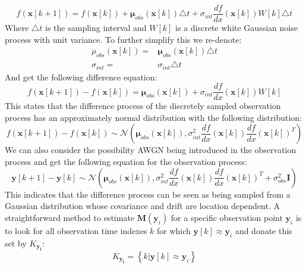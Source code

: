 \[
f\left(\mathbf{x}\left[k+1\right]\right)=f\left(\mathbf{x}\left[k\right]\right)+\mathbf{\mu}_{obs}\left(\mathbf{x}\left[k\right]\right)\triangle t+\sigma_{int}\frac{df}{dx}\left(\mathbf{x}\left[k\right]\right)W\left[k\right]\triangle t
\]
Where $\triangle t$ is the sampling interval and $W\left[k\right]$
is a discrete white Gaussian noise process with unit variance. To
further simplify this we re-denote:
\begin{align*}
	\mu_{obs}\left(\mathbf{x}\left[k\right]\right)= & \mathbf{\mu}_{obs}\left(\mathbf{x}\left[k\right]\right)\triangle t\\
	\sigma_{int}= & \sigma_{int}\triangle t
\end{align*}
And get the following difference equation:
\[
f\left(\mathbf{x}\left[k+1\right]\right)-f\left(\mathbf{x}\left[k\right]\right)=\mathbf{\mu}_{obs}\left(\mathbf{x}\left[k\right]\right)+\sigma_{int}\frac{df}{dx}\left(\mathbf{x}\left[k\right]\right)W\left[k\right]
\]
This states that the difference process of the discretely sampled observation process has an approximately normal distribution with the following distribution:
\begin{equation}
f\left(\mathbf{x}\left[k+1\right]\right)-f\left(\mathbf{x}\left[k\right]\right)\sim\mathcal{N}\left(\mathbf{\mu}_{obs}\left(\mathbf{x}\left[k\right]\right),\sigma_{int}^{2}\frac{df}{dx}\left(\mathbf{x}\left[k\right]\right)\frac{df}{dx}\left(\mathbf{x}\left[k\right]\right)^{T}\right)\label{eq:dist_diff}
\end{equation}
We can also consider the possibility \ac{AWGN} being introduced in the observation process and get the following equation for the observation process:
\begin{equation}
\mathbf{y}\left[k+1\right]-\mathbf{y}\left[k\right]\sim\mathcal{N}\left(\mathbf{\mu}_{obs}\left(\mathbf{x}\left[k\right]\right),\sigma_{int}^{2}\frac{df}{dx}\left(\mathbf{x}\left[k\right]\right)\frac{df}{dx}\left(\mathbf{x}\left[k\right]\right)^{T}+\sigma_{obs}^{2}\mathbf{I}\right)
\end{equation}
This indicates that the difference process can be seen as being sampled from a Gaussian distribution whose covariance and drift are location dependent. A straightforward method to estimate $\mathbf{M}\left(\mathbf{y}_{i}\right)$ for a specific observation point $\mathbf{y}_{i}$ is to look for all observation time indexes $k$ for which $\mathbf{y}[k]\approx\mathbf{y}_{i}$ and donate this set by $K_{\mathbf{y_{i}}}$:
\[
K_{\mathbf{y_{i}}}=\left\{ k|\mathbf{y}[k]\approx\mathbf{y}_{i}\right\} 
\]

